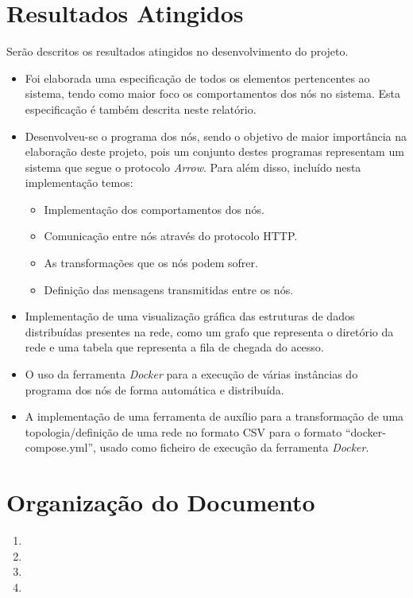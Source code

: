 \section{Resultados Atingidos}
Serão descritos os resultados atingidos no desenvolvimento do projeto.

\begin{itemize}
    \item Foi elaborada uma especificação de todos os elementos pertencentes ao sistema, tendo como maior foco os comportamentos dos nós no sistema. Esta especificação é também descrita neste relatório. 
    \item Desenvolveu-se o programa dos nós, sendo o objetivo de maior importância na elaboração deste projeto, pois um conjunto destes programas representam um sistema que segue o protocolo \emph{Arrow}. Para além disso, incluído nesta implementação temos:

    \begin{itemize}
	\item Implementação dos comportamentos dos nós.
	\item Comunicação entre nós através do protocolo \acs{HTTP}.
	\item As transformações que os nós podem sofrer.
	\item Definição das mensagens transmitidas entre os nós.
    \end{itemize}

\item Implementação de uma visualização gráfica das estruturas de dados distribuídas presentes na rede, como um grafo que representa o diretório da rede e uma tabela que representa a fila de chegada do acesso.
\item O uso da ferramenta \emph{Docker} para a execução de várias instâncias do programa dos nós de forma automática e distribuída.
\item A implementação de uma ferramenta de auxílio para a transformação de uma topologia/definição de uma rede no formato \acs{CSV} para o formato ``docker-compose.yml'', usado como ficheiro de execução da ferramenta \emph{Docker}.

\end{itemize}




\section{Organização do Documento}
\label{sec:organ}
\begin{enumerate}
\item 
\item 
\item 
\item 
\end{enumerate}
